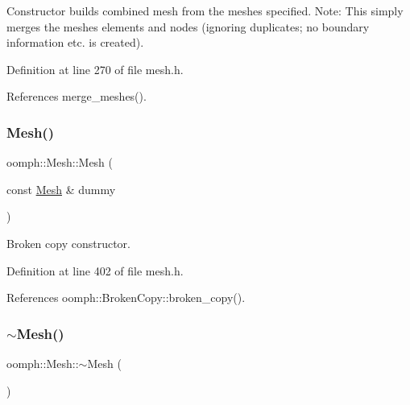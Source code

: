 Constructor builds combined mesh from the meshes specified. Note\+: This simply merges the meshes\textquotesingle{} elements and nodes (ignoring duplicates; no boundary information etc. is created). 



Definition at line 270 of file mesh.\+h.



References merge\+\_\+meshes().

\mbox{\label{classoomph_1_1Mesh_adfd1ee15a991dcb3568c9856c86a3655}} 
\subsubsection{\texorpdfstring{Mesh()}{Mesh()}\hspace{0.1cm}{\footnotesize\ttfamily [3/3]}}
{\footnotesize\ttfamily oomph\+::\+Mesh\+::\+Mesh (\begin{DoxyParamCaption}\item[{const \hyperlink{classoomph_1_1Mesh}{Mesh} \&}]{dummy }\end{DoxyParamCaption})\hspace{0.3cm}{\ttfamily [inline]}}



Broken copy constructor. 



Definition at line 402 of file mesh.\+h.



References oomph\+::\+Broken\+Copy\+::broken\+\_\+copy().

\mbox{\label{classoomph_1_1Mesh_abc071afb5c34ca6ced42734030f81353}} 
\subsubsection{\texorpdfstring{$\sim$\+Mesh()}{~Mesh()}}
{\footnotesize\ttfamily oomph\+::\+Mesh\+::$\sim$\+Mesh (\begin{DoxyParamCaption}{ }\end{DoxyParamCaption})\hspace{0.3cm}{\ttfamily [virtual]}}




